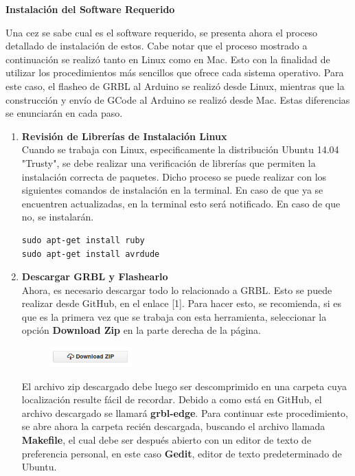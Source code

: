 \documentclass{article}
\begin{document}
\begin{multicols}{2}
\begin{itemize}
\end{itemize}
\begin{center}
\textbf{Instalación del Software Requerido}
\end{center}
Una cez se sabe cual es el software requerido, se presenta ahora el proceso detallado de instalación de estos. Cabe notar que el proceso mostrado a continuación se realizó tanto en Linux como en Mac. Esto con la finalidad de utilizar los procedimientos más sencillos que ofrece cada sistema operativo. Para este caso, el flasheo de GRBL al Arduino se realizó desde Linux, mientras que la construcción y envío de GCode al Arduino se realizó desde Mac. Estas diferencias se enunciarán en cada paso.

\begin{enumerate}
\item \textbf{Revisión de Librerías de Instalación Linux}\\
Cuando se trabaja con Linux, especificamente la distribución Ubuntu 14.04 "Trusty", se debe realizar una verificación de librerías que permiten la instalación correcta de paquetes. Dicho proceso se puede realizar con los siguientes comandos de instalación en la terminal. En caso de que ya se encuentren actualizadas, en la terminal esto será notificado. En caso de que no, se instalarán.
\begin{lstlisting}
sudo apt-get install ruby
sudo apt-get install avrdude
\end{lstlisting}

\item \textbf{Descargar GRBL y Flashearlo}\\
Ahora, es necesario descargar todo lo relacionado a GRBL. Esto se puede realizar desde GitHub, en el enlace [1]. Para hacer esto, se recomienda, si es que es la primera vez que se trabaja con esta herramienta, seleccionar la opción \textbf{Download Zip} en la parte derecha de la página.
\begin{figure}[H]
\centering
\includegraphics[width=0.3\textwidth]{BotonDescarga.png}
\label{fig:Boton}
\end{figure}

El archivo zip descargado debe luego ser descomprimido en una carpeta cuya localización resulte fácil de recordar. Debido a como está en GitHub, el archivo descargado se llamará \textbf{grbl-edge}. Para continuar este procedimiento, se abre ahora la carpeta recién descargada, buscando el archivo llamada \textbf{Makefile}, el cual debe ser después abierto con un editor de texto de preferencia personal, en este caso \textbf{Gedit}, editor de texto predeterminado de Ubuntu.


\end{enumerate}
\end{multicols}
\end{document}
